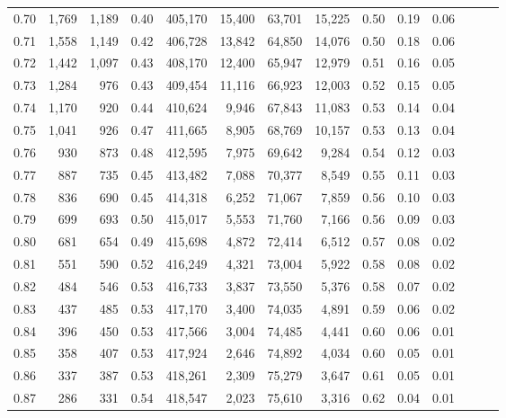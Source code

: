 \begin{tabular}{rrrrrrrrrrrrrr}
0.70 &   1,769 &  1,189 &  0.40 &  405,170 &   15,400 &  63,701 &  15,225 &  0.50 &  0.19 &      0.06 \\
0.71 &   1,558 &  1,149 &  0.42 &  406,728 &   13,842 &  64,850 &  14,076 &  0.50 &  0.18 &      0.06 \\
0.72 &   1,442 &  1,097 &  0.43 &  408,170 &   12,400 &  65,947 &  12,979 &  0.51 &  0.16 &      0.05 \\
0.73 &   1,284 &    976 &  0.43 &  409,454 &   11,116 &  66,923 &  12,003 &  0.52 &  0.15 &      0.05 \\
0.74 &   1,170 &    920 &  0.44 &  410,624 &    9,946 &  67,843 &  11,083 &  0.53 &  0.14 &      0.04 \\
0.75 &   1,041 &    926 &  0.47 &  411,665 &    8,905 &  68,769 &  10,157 &  0.53 &  0.13 &      0.04 \\
0.76 &     930 &    873 &  0.48 &  412,595 &    7,975 &  69,642 &   9,284 &  0.54 &  0.12 &      0.03 \\
0.77 &     887 &    735 &  0.45 &  413,482 &    7,088 &  70,377 &   8,549 &  0.55 &  0.11 &      0.03 \\
0.78 &     836 &    690 &  0.45 &  414,318 &    6,252 &  71,067 &   7,859 &  0.56 &  0.10 &      0.03 \\
0.79 &     699 &    693 &  0.50 &  415,017 &    5,553 &  71,760 &   7,166 &  0.56 &  0.09 &      0.03 \\
0.80 &     681 &    654 &  0.49 &  415,698 &    4,872 &  72,414 &   6,512 &  0.57 &  0.08 &      0.02 \\
0.81 &     551 &    590 &  0.52 &  416,249 &    4,321 &  73,004 &   5,922 &  0.58 &  0.08 &      0.02 \\
0.82 &     484 &    546 &  0.53 &  416,733 &    3,837 &  73,550 &   5,376 &  0.58 &  0.07 &      0.02 \\
0.83 &     437 &    485 &  0.53 &  417,170 &    3,400 &  74,035 &   4,891 &  0.59 &  0.06 &      0.02 \\
0.84 &     396 &    450 &  0.53 &  417,566 &    3,004 &  74,485 &   4,441 &  0.60 &  0.06 &      0.01 \\
0.85 &     358 &    407 &  0.53 &  417,924 &    2,646 &  74,892 &   4,034 &  0.60 &  0.05 &      0.01 \\
0.86 &     337 &    387 &  0.53 &  418,261 &    2,309 &  75,279 &   3,647 &  0.61 &  0.05 &      0.01 \\
0.87 &     286 &    331 &  0.54 &  418,547 &    2,023 &  75,610 &   3,316 &  0.62 &  0.04 &      0.01 \\

\end{tabular}
